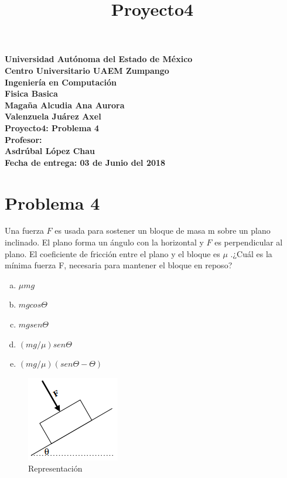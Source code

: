 \documentclass[11pt,letter]{article}
\begin{document}
\title{Proyecto4}
\begin{center}
\textbf{\LARGE Universidad Aut\'onoma del Estado de M\'exico}\\[1cm] 
\large \textbf{Centro Universitario UAEM Zumpango}\\[1cm]
\large \textbf{Ingenier\'ia en Computaci\'on}\\[1cm]
\large \textbf{Fisica Basica}\\[0.5cm] 
\large \textbf{Magaña Alcudia Ana Aurora}\\
\large \textbf{Valenzuela Ju\'arez Axel}\\[1cm]
\large \textbf{Proyecto4: Problema 4}\\[1cm]
\large \textbf{Profesor:}\\[0.5cm]
\large \textbf{Asdr\'ubal L\'opez Chau}\\[1.2cm]
\large \textbf{Fecha de entrega: 03 de Junio del 2018}



\end{center}
\newpage
\section*{Problema 4}
Una fuerza $F$ es usada para sostener un bloque de masa m sobre un plano inclinado. El plano forma un \'angulo con la horizontal y $F$ es perpendicular al plano. El coeficiente de fricción entre el plano y el bloque es $\mu$ .¿Cu\'al es la m\'inima fuerza F, necesaria para mantener el bloque en reposo?\\
\begin{enumerate}[a)]
\item $\mu mg$
\item $mg cos\Theta $
\item $mg sen\Theta $
\item $(mg/\mu)sen\Theta $
\item $(mg/\mu)(sen\Theta -\Theta) $
\end{enumerate}
\begin{figure}[h]
  \centering
  \includegraphics{imagen1}
      \caption{Representaci\'on}
\end{figure}
\end{document}
